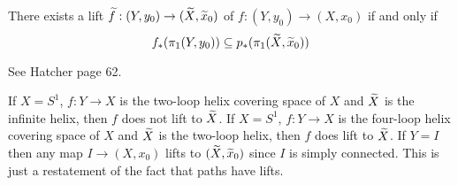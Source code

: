 \begin{prop}
	There exists a lift $\widetilde f: (Y,y_0) \to (\widetilde X,\widetilde x_0)$ of $f: (Y,y_0) \to (X,x_0)$ if and only if
	\[f_*(\pi_1(Y,y_0)) \subseteq p_*(\pi_1(\widetilde X,\widetilde x_0))\]
\end{prop}

\begin{prop}
	See Hatcher page 62.
\end{prop}

\begin{exam}
	\leavevmode
	\begin{enum}
		\io If $X=S^1$, $f: Y \to X$ is the two-loop helix covering space of $X$ and $\widetilde X$ is the infinite helix, then $f$ does not lift to $\widetilde X$.
		\io If $X=S^1$, $f: Y \to X$ is the four-loop helix covering space of $X$ and $\widetilde X$ is the two-loop helix, then $f$ does lift to $\widetilde X$.
		\io If $Y=I$ then any map $I \to (X,x_0)$ lifts to $(\widetilde X,\widetilde x_0)$ since $I$ is simply connected.
		This is just a restatement of the fact that paths have lifts.
	\end{enum}
\end{exam}